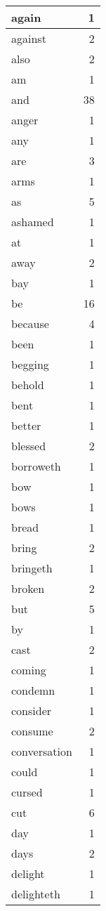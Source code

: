 \begin{center}
\begin{longtable}{l|r}
again & 1 \\ \hline
against & 2 \\ \hline
also & 2 \\ \hline
am & 1 \\ \hline
and & 38 \\ \hline
anger & 1 \\ \hline
any & 1 \\ \hline
are & 3 \\ \hline
arms & 1 \\ \hline
as & 5 \\ \hline
ashamed & 1 \\ \hline
at & 1 \\ \hline
away & 2 \\ \hline
bay & 1 \\ \hline
be & 16 \\ \hline
because & 4 \\ \hline
been & 1 \\ \hline
begging & 1 \\ \hline
behold & 1 \\ \hline
bent & 1 \\ \hline
better & 1 \\ \hline
blessed & 2 \\ \hline
borroweth & 1 \\ \hline
bow & 1 \\ \hline
bows & 1 \\ \hline
bread & 1 \\ \hline
bring & 2 \\ \hline
bringeth & 1 \\ \hline
broken & 2 \\ \hline
but & 5 \\ \hline
by & 1 \\ \hline
cast & 2 \\ \hline
coming & 1 \\ \hline
condemn & 1 \\ \hline
consider & 1 \\ \hline
consume & 2 \\ \hline
conversation & 1 \\ \hline
could & 1 \\ \hline
cursed & 1 \\ \hline
cut & 6 \\ \hline
day & 1 \\ \hline
days & 2 \\ \hline
delight & 1 \\ \hline
delighteth & 1 \\ \hline

\end{longtable}
\end{center}
